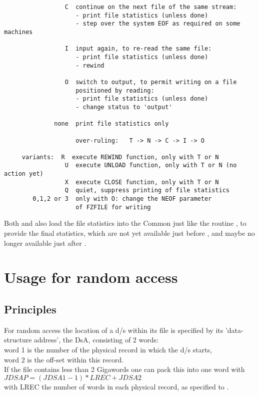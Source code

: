 {\begin{verbatim}
                 C  continue on the next file of the same stream:
                    - print file statistics (unless done)
                    - step over the system EOF as required on some machines

                 I  input again, to re-read the same file:
                    - print file statistics (unless done)
                    - rewind

                 O  switch to output, to permit writing on a file
                    positioned by reading:
                    - print file statistics (unless done)
                    - change status to 'output'

              none  print file statistics only

                    over-ruling:   T -> N -> C -> I -> O

     variants:  R  execute REWIND function, only with T or N
                 U  execute UNLOAD function, only with T or N (no action yet)
                 X  execute CLOSE function, only with T or N
                 Q  quiet, suppress printing of file statistics
        0,1,2 or 3  only with O: change the NEOF parameter
                    of FZFILE for writing
\end{verbatim}
\spnorm
Both  and  also load the file statistics
into the Common  just like the routine ,
to provide the final statistics,
which are not yet available just before ,
and maybe no longer available just after .

\section{Usage for random access}

\subsection*{Principles}

For random access the location of a d/s within its file is specified
by its 'data-structure address', the DsA, consisting of 2 words:\\
\hspace*{8mm}
word 1 is the number of the physical record in which the d/s starts,\\
\hspace*{8mm}
word 2 is the off-set within this record.\\
If the file contains less than 2 Gigawords one can pack this into
one word with\\
\hspace*{16mm}
      $ JDSAP = (JDSA1-1) * LREC  + JDSA2 $\\
with LREC the number of words in each physical record, as specified
to .

}

